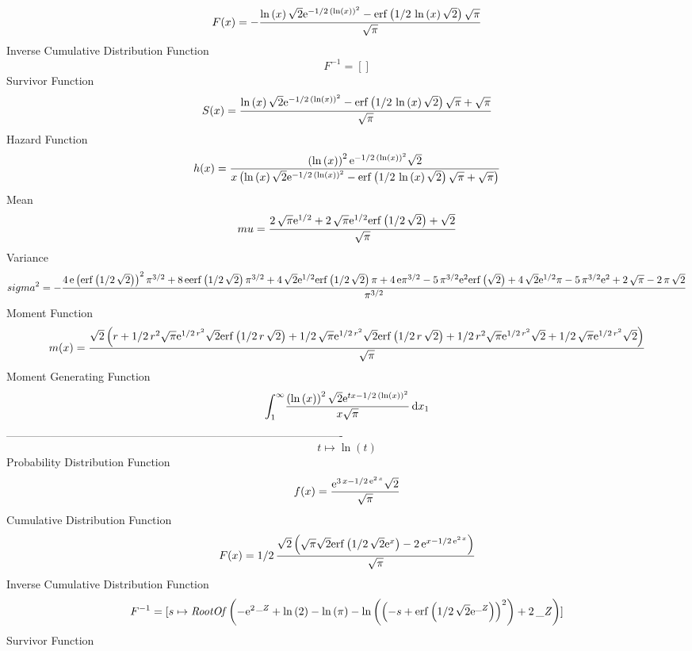 \documentclass[12pt]{article}
\begin{document}
 $$F(x)=-{\frac {\ln  \left( x \right) \sqrt {2}{{\rm e}^{-1/2\, \left( \ln 
 \left( x \right)  \right) ^{2}}}-{\rm erf} \left(1/2\,\ln  \left( x
 \right) \sqrt {2}\right)\sqrt {\pi}}{\sqrt {\pi}}}
$$ Inverse Cumulative Distribution Function 
  $$F^{-1} = []
$$Survivor Function 
 $$ S(x)={\frac {\ln  \left( x \right) \sqrt {2}{{\rm e}^{-1/2\, \left( \ln 
 \left( x \right)  \right) ^{2}}}-{\rm erf} \left(1/2\,\ln  \left( x
 \right) \sqrt {2}\right)\sqrt {\pi}+\sqrt {\pi}}{\sqrt {\pi}}}
$$ Hazard Function 
 $$ h(x)={\frac { \left( \ln  \left( x \right)  \right) ^{2}{{\rm e}^{-1/2\,
 \left( \ln  \left( x \right)  \right) ^{2}}}\sqrt {2}}{x \left( \ln 
 \left( x \right) \sqrt {2}{{\rm e}^{-1/2\, \left( \ln  \left( x
 \right)  \right) ^{2}}}-{\rm erf} \left(1/2\,\ln  \left( x \right) 
\sqrt {2}\right)\sqrt {\pi}+\sqrt {\pi} \right) }}
$$Mean 
 $$ mu={\frac {2\,\sqrt {\pi}{{\rm e}^{1/2}}+2\,\sqrt {\pi}{{\rm e}^{1/2}}
{\rm erf} \left(1/2\,\sqrt {2}\right)+\sqrt {2}}{\sqrt {\pi}}}
$$ Variance 
 $$ sigma^2 = -{\frac {4\,{\rm e} \left( {\rm erf} \left(1/2\,\sqrt {2}\right)
 \right) ^{2}{\pi}^{3/2}+8\,{\rm e}{\rm erf} \left(1/2\,\sqrt {2}
\right){\pi}^{3/2}+4\,\sqrt {2}{{\rm e}^{1/2}}{\rm erf} \left(1/2\,
\sqrt {2}\right)\pi+4\,{\rm e}{\pi}^{3/2}-5\,{\pi}^{3/2}{{\rm e}^{2}}
{\rm erf} \left(\sqrt {2}\right)+4\,\sqrt {2}{{\rm e}^{1/2}}\pi-5\,{
\pi}^{3/2}{{\rm e}^{2}}+2\,\sqrt {\pi}-2\,\pi\,\sqrt {2}}{{\pi}^{3/2}}
}
$$Moment Function 
 $$ m(x) = {\frac {\sqrt {2} \left( r+1/2\,{r}^{2}\sqrt {\pi}{{\rm e}^{1/2\,{r}^{
2}}}\sqrt {2}{\rm erf} \left(1/2\,r\,\sqrt {2}\right)+1/2\,\sqrt {\pi}
{{\rm e}^{1/2\,{r}^{2}}}\sqrt {2}{\rm erf} \left(1/2\,r\,\sqrt {2}
\right)+1/2\,{r}^{2}\sqrt {\pi}{{\rm e}^{1/2\,{r}^{2}}}\sqrt {2}+1/2\,
\sqrt {\pi}{{\rm e}^{1/2\,{r}^{2}}}\sqrt {2} \right) }{\sqrt {\pi}}}
$$ Moment Generating Function 
 $$\int_{1}^{\infty }\!{\frac { \left( \ln  \left( x \right)  \right) ^{2
}\sqrt {2}{{\rm e}^{tx-1/2\, \left( \ln  \left( x \right)  \right) ^{2
}}}}{x\sqrt {\pi}}}\,{\rm d}x_{{1}}
$$-------------------------------------------------------------------------------------------  \\$$t\mapsto \ln  \left( t \right) 
$$Probability Distribution Function 
$$  f(x)={\frac {{{\rm e}^{3\,x-1/2\,{{\rm e}^{2\,x}}}}\sqrt {2}}{\sqrt {\pi}}}
$$Cumulative Distribution Function  
 $$F(x)=1/2\,{\frac {\sqrt {2} \left( \sqrt {\pi}\sqrt {2}{\rm erf} \left(1/2
\,\sqrt {2}{{\rm e}^{x}}\right)-2\,{{\rm e}^{x-1/2\,{{\rm e}^{2\,x}}}}
 \right) }{\sqrt {\pi}}}
$$ Inverse Cumulative Distribution Function 
  $$F^{-1} = [s\mapsto {\it RootOf} \left( -{{\rm e}^{2\,{\it \_Z}}}+\ln  \left( 2
 \right) -\ln  \left( \pi \right) -\ln  \left(  \left( -s+{\rm erf} 
\left(1/2\,\sqrt {2}{{\rm e}^{{\it \_Z}}}\right) \right) ^{2} \right) 
+2\,{\it \_Z} \right) ]
$$Survivor Function 
\end{document}
